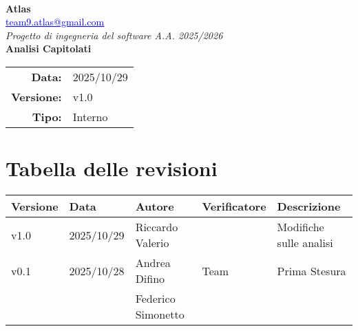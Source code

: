 \documentclass[a4paper,12pt]{article}
\makeatletter
\newcommand{\Gruppo}{Atlas}
\newcommand{\Email}{\href{mailto:team9.atlas@gmail.com}{\textcolor{blue}{\underline{team9.atlas@gmail.com}}}}
\newcommand{\Titolo}{Analisi Capitolati}
\newcommand{\DataModifica}{2025/10/29}
\newcommand{\LogoGruppo}{img/AtlasLogo.png} %
\newcommand{\VersioneVerbale}{v1.0} %
\newcommand{\Interno}{Interno}
\makeatother
\begin{document}
\begin{titlepage}
    \centering

    \vspace*{0cm}
    \\[0.8cm]

    {\LARGE \textbf{\Gruppo}}\\[0.1cm]
    {\large \Email}\\[1.2cm]

    {\Large \textit{Progetto di ingegneria del software A.A. 2025/2026}}\\[1.5cm]

    {\Huge \textbf{\Titolo}}\\[1.5cm]

    \begin{tabular}{rl}
        \textbf{Data:} & \DataModifica \\
        \textbf{Versione:} & \VersioneVerbale \\
        \textbf{Tipo:} & \Interno \\
    \end{tabular}

\end{titlepage}


\section*{Tabella delle revisioni}{
    \begin{center} 
        \begin{tabular}{|l|l|l|l|l|}
            \hline
            \textbf{Versione} & \textbf{Data} & \textbf{Autore} & \textbf{Verificatore} & \textbf{Descrizione} \\
            \hline
            v1.0& 2025/10/29 & Riccardo Valerio & & Modifiche sulle analisi \\
            \hline
            v0.1 & 2025/10/28 & Andrea Difino & Team & Prima Stesura \\
            && Federico Simonetto &&\\
            \hline
            
        \end{tabular}
    \end{center}
}
\end{document}
